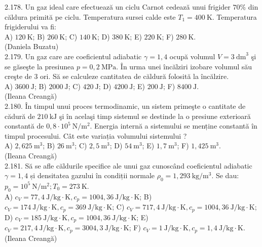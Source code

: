 2.178. Un gaz ideal care efectuează un ciclu Carnot cedează unui frigider $70 \%$ din căldura primită pe ciclu. Temperatura sursei calde este $T_{1}=400 \mathrm{~K}$. Temperatura frigiderului va fi:\\ A) $120 \mathrm{~K}$; B) $260 \mathrm{~K}$; C) $140 \mathrm{~K}$; D) $380 \mathrm{~K}$; E) $220 \mathrm{~K}$; F) $280 \mathrm{~K}$.\\ (Daniela Buzatu)\\

2.179. Un gaz care are coeficientul adiabatic $\gamma=1,4$ ocupă volumul $V=3 \mathrm{~dm}^{3}$ şi se găseşte la presiunea $p=0,2 \mathrm{~MPa}$. În urma unei încălziri izobare volumul său creşte de $3$ ori. Să se calculeze cantitatea de căldură folosită la încălzire.\\ A) $3600 \mathrm{~J}$; B) $2000 \mathrm{~J}$; C) $420 \mathrm{~J}$; D) $4200 \mathrm{~J}$; E) $200 \mathrm{~J}$; F) $8400 \mathrm{~J}$.\\ (Ileana Creangă)\\

2.180. În timpul unui proces termodinamic, un sistem primeşte o cantitate de cădură de $210 \mathrm{~kJ}$ şi în acelaşi timp sistemul se destinde la o presiune exterioară constantă de $0,8 \cdot 10^{5} \mathrm{~N} / \mathrm{m}^{2}$. Energia internă a sistemului se menține constantă în timpul procesului. Cât este variația volumului sistemului ?\\ A) $2,625 \mathrm{~m}^{3}$; B) $26 \mathrm{~m}^{3}$; C) $2,5 \mathrm{~m}^{3}$; D) $54 \mathrm{~m}^{3}$; E) $1,7 \mathrm{~m}^{3}$; F) $1,425 \mathrm{~m}^{3}$.\\ (Ileana Creangă)\\

2.181. Să se afle căldurile specifice ale unui gaz cunoscând coeficientul adiabatic $\gamma=1,4$ și densitatea gazului în condiții normale $\rho_{0}=1,293 \mathrm{~kg} / \mathrm{m}^{3}$. Se dau: $p_{0}=10^{5} \mathrm{~N} / \mathrm{m}^{2} ; T_{0}=273 \mathrm{~K}$.\\ A) $c_{V}=77,4 \mathrm{~J} / \mathrm{kg} \cdot \mathrm{K} , c_{p}=1004,36 \mathrm{~J} / \mathrm{kg} \cdot \mathrm{K}$; B) $c_{V}=174 \mathrm{~J} / \mathrm{kg} \cdot \mathrm{K} , c_{p}=369 \mathrm{~J} / \mathrm{kg} \cdot \mathrm{K}$; C) $c_{V}=717,4 \mathrm{~J} / \mathrm{kg} \cdot \mathrm{K} , c_{p}=1004,36 \mathrm{~J} / \mathrm{kg} \cdot \mathrm{K}$; D) $c_{V}=185 \mathrm{~J} / \mathrm{kg} \cdot \mathrm{K} , c_{p}=1004,36 \mathrm{~J} / \mathrm{kg} \cdot \mathrm{K}$; E) $c_{V}=217,4 \mathrm{~J} / \mathrm{kg} \cdot \mathrm{K} , c_{p}=3004,3 \mathrm{~J} / \mathrm{kg} \cdot \mathrm{K}$; F) $c_{V}=1 \mathrm{~J} / \mathrm{kg} \cdot \mathrm{K} , c_{p}=1,4 \mathrm{~J} / \mathrm{kg} \cdot \mathrm{K}$.\\ (Ileana Creangă)\\

